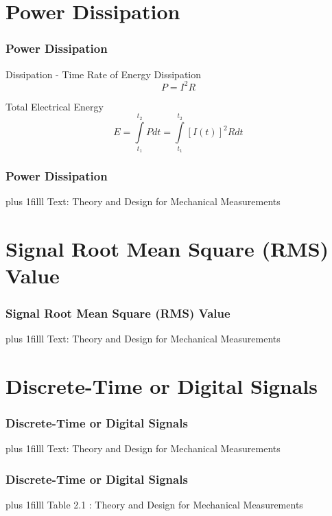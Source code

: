 \documentclass[fleqn]{beamer} %
\newcommand{\sectiontitleII}{Power Dissipation}
\newcommand{\sectiontitleIII}{Signal Root Mean Square (RMS) Value}
\newcommand{\sectiontitleIV}{Discrete-Time or Digital Signals}
\newcommand{\btVFill}{\vskip0pt plus 1filll}
\begin{document}
\section{\sectiontitleII}	
	\begin{frame}[label=sectionII] \small
		\frametitle{\sectiontitleII}
Dissipation - Time Rate of Energy Dissipation    \[ P=I^2R \]  
	
	Total Electrical Energy \hspace{5mm} \[ E =\int\limits_{t_1}^{t_2}P dt=\int\limits_{t_1}^{t_2}[I(t)]^2R dt \]
		
		
	\end{frame}

	\begin{frame} \small
		\frametitle{\sectiontitleII}
		\bigskip    
	
	
		\btVFill
		\tiny{Text: Theory and Design for Mechanical Measurements}	
	\end{frame}
	

	
\section{\sectiontitleIII}	

\begin{frame}[label=sectionIII] \small
\frametitle{\sectiontitleIII}
\bigskip



\btVFill
\tiny{Text: Theory and Design for Mechanical Measurements}		
\end{frame}

\section{\sectiontitleIV}	

\begin{frame}[label=sectionIV] \small
\frametitle{\sectiontitleIV}
\bigskip



\btVFill
\tiny{Text: Theory and Design for Mechanical Measurements}	
\end{frame}

\begin{frame}[label=sectionIV] \small
\frametitle{\sectiontitleIV}
\bigskip



\btVFill
\tiny{Table 2.1 : Theory and Design for Mechanical Measurements}	
\end{frame}
\end{document}
